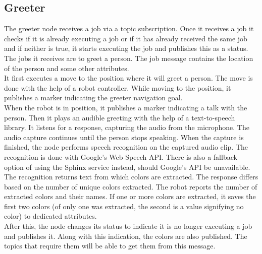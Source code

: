 \documentclass[a4paper,
  twoside, %
  headlines=2.1 %
  ]{scrartcl}
\begin{document}
\subsection{Greeter}
The greeter node receives a job via a topic subscription. Once it receives a job it checks if it is already executing a job or if it has already received the same job and if neither is true, it starts executing the job and publishes this as a status. The jobs it receives are to greet a person. The job message contains the location of the person and some other attributes.
\\
It first executes a move to the position where it will greet a person. The move is done with the help of a robot controller. While moving to the position, it publishes a marker indicating the greeter navigation goal. 
\\
When the robot is in position, it publishes a marker indicating a talk with the person. Then it plays an audible greeting with the help of a text-to-speech library. It listens for a response, capturing the audio from the microphone. The audio capture continues until the person stops speaking. When the capture is finished, the node performs speech recognition on the captured audio clip. The recognition is done with Google’s Web Speech API. There is also a fallback option of using the Sphinx service instead, should Google’s API be unavailable. 
\\
The recognition returns text from which colors are extracted. The response differs based on the number of unique colors extracted. The robot reports the number of extracted colors and their names. If one or more colors are extracted, it saves the first two colors (of only one was extracted, the second is a value signifying no color) to dedicated attributes. 
\\
After this, the node changes its status to indicate it is no longer executing a job and publishes it. Along with this indication, the colors are also published. The topics that require them will be able to get them from this message. 
\end{document}
